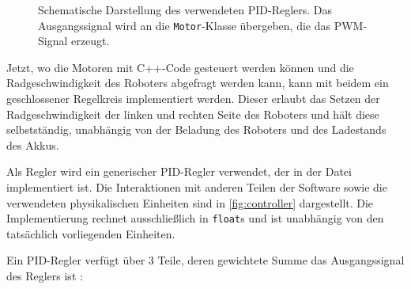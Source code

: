 \documentclass[german]{thesis_KBS}
\newcommand{\code}[1]{\texttt{#1}}  %
\begin{document}
\begin{figure}[h]
    \centering
    \caption{
        Schematische Darstellung des verwendeten PID-Reglers. Das
        Ausgangssignal wird an die \code{Motor}-Klasse übergeben, die das
        PWM-Signal erzeugt.
    }
    \label{fig:controller}
\end{figure}

Jetzt, wo die Motoren mit C++-Code gesteuert werden können und die
Radgeschwindigkeit des Roboters abgefragt werden kann, kann mit beidem ein
geschlossener Regelkreis implementiert werden. Dieser erlaubt das Setzen der
Radgeschwindigkeit der linken und rechten Seite des Roboters und hält diese
selbstständig, unabhängig von der Beladung des Roboters und des Ladestands des
Akkus.

Als Regler wird ein generischer PID-Regler verwendet, der in der Datei
 implementiert ist. Die Interaktionen mit anderen
Teilen der Software sowie die verwendeten physikalischen Einheiten sind in
\autoref{fig:controller} dargestellt. Die Implementierung rechnet ausschließlich
in \code{float}s und ist unabhängig von den tatsächlich vorliegenden Einheiten.

Ein PID-Regler verfügt über 3 Teile, deren gewichtete Summe das Ausgangssignal
des Reglers ist \cite{pid-theory}:
\end{document}
